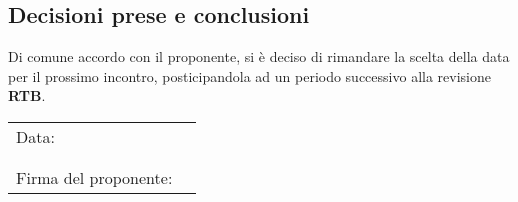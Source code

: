 \documentclass[italian,12pt]{article}
\begin{document}
\subsection{Decisioni prese e conclusioni}
Di comune accordo con il proponente, si è deciso di rimandare la scelta della data per il prossimo incontro,
posticipandola ad un periodo successivo alla revisione \textbf{RTB}.\\


\newpage
\begin{table}[b]
	\begin{tabular}{@{}p{5cm}p{10cm}@{}}
		Data:  & \hrulefill \\
		       &            \\
		       &            \\
		Firma del proponente: & \hrulefill \\
	\end{tabular}
\end{table}
\end{document}
